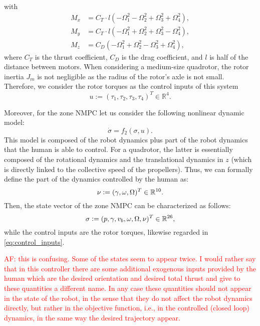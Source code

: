  with
 \begin{equation*}
 	\begin{aligned}
    M_x &= C_T\cdot l(-\Omega_{1}^{2}-\Omega_{2}^{2}+\Omega_{3}^{2}+\Omega_{4}^{2}),\\
    M_y &= C_T\cdot l(-\Omega_{1}^{2}+\Omega_{2}^{2}+\Omega_{3}^{2}-\Omega_{4}^{2}),\\
    M_z &= C_D(-\Omega_{1}^{2}+\Omega_{2}^{2}-\Omega_{3}^{2}+\Omega_{4}^{2}),
 	\end{aligned}
 \end{equation*}
where $C_T$ is the thrust coefficient, $C_D$ is the drag coefficient, and $l$ is half of the distance between motors. When considering a medium-size quadrotor, the rotor inertia $J_m$ is not negligible as the radius of the rotor's axle is not small. Therefore, we consider the rotor torques as the control inputs of this system
\begin{equation}
	u := (\tau_1,\tau_2,\tau_3,\tau_4)^T \in \mathbb{R}^4.\label{eq:control_inputs}
\end{equation}



Moreover, for the zone NMPC let us consider the following nonlinear dynamic model:
\begin{equation*}
	\dot{\sigma} = f_2(\sigma,u).
\end{equation*}
This model is composed of the robot dynamics plus part of the robot dynamics that the human is able to control. For a quadrotor, the latter is essentially composed of the rotational dynamics and the translational dynamics in $z$ (which is directly linked to the collective speed of the propellers). Thus, we can formally define the part of the dynamics controlled by the human as:
\begin{equation*}
	\nu \vcentcolon = (\gamma, \omega, \Omega)^T \in \mathbb{R}^{10}.
\end{equation*}
Then, the state vector of the zone NMPC can be characterized as follows:
\begin{equation*}
	\sigma \vcentcolon = (p,\gamma,v_b,\omega,\Omega,\nu)^T \in \mathbb{R}^{26},
\end{equation*}
while the control inputs are the rotor torques, likewise regarded in \eqref{eq:control_inputs}.



\textcolor{red}{AF: this is confusing. Some of the states seem to appear twice. I would rather say that in this controller there are some additional exogenous inputs provided by the human which are the desired orientation and desired total thrust and give to these quantities a different name. In any case these quantities should not appear in the state of the robot, in the sense that they do not affect the robot dynamics directly, but rather in the objective function, i.e., in the controlled (closed loop) dynamics, in the same way the desired trajectory appear.}

